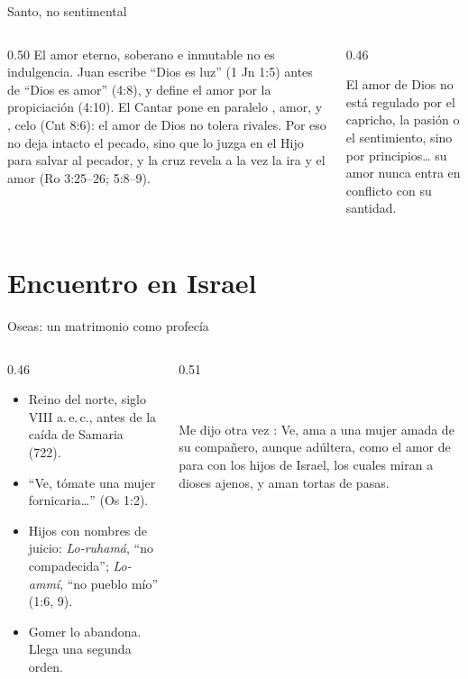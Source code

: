 \begin{frame}{Santo, no sentimental}
\begin{columns}[c,onlytextwidth]
\begin{column}{0.50\textwidth}\small
El amor eterno, soberano e inmutable no es indulgencia. Juan escribe ``Dios es luz'' (1 Jn 1:5) antes de ``Dios es amor'' (4:8), y define el amor por la propiciación (4:10). El Cantar pone en paralelo , amor, y , celo (Cnt 8:6): el amor de Dios no tolera rivales. Por eso no deja intacto el pecado, sino que lo juzga en el Hijo para salvar al pecador, y la cruz revela a la vez la ira y el amor (Ro 3:25--26; 5:8--9).
\end{column}
\begin{column}{0.46\textwidth}
\begin{cita}El amor de Dios no está regulado por el capricho, la pasión o el sentimiento, sino por principios\ldots{} su amor nunca entra en conflicto con su santidad.\end{cita}
\end{column}
\end{columns}
\end{frame}

\section{Encuentro en Israel}

\begin{frame}{Oseas: un matrimonio como profecía}
\begin{columns}[t,onlytextwidth]
\begin{column}{0.46\textwidth}\small
\begin{itemize}
\item Reino del norte, siglo VIII a.\,e.\,c., antes de la caída de Samaria (722).
\item ``Ve, tómate una mujer fornicaria\ldots'' (Os 1:2).
\item Hijos con nombres de juicio: \emph{Lo-ruhamá}, ``no compadecida''; \emph{Lo-ammí}, ``no pueblo mío'' (1:6, 9).
\item Gomer lo abandona. Llega una segunda orden.
\end{itemize}
\end{column}
\begin{column}{0.51\textwidth}
\begin{center}\\[1pt]\end{center}
\begin{cita}Me dijo otra vez \SENOR: Ve, ama a una mujer amada de su compañero, aunque adúltera, como el amor de \SENOR{} para con los hijos de Israel, los cuales miran a dioses ajenos, y aman tortas de pasas.\end{cita}
\end{column}
\end{columns}
\end{frame}

